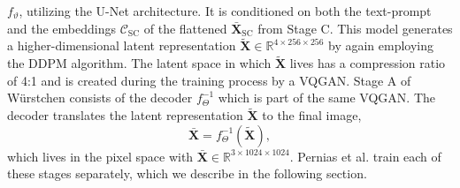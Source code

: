 $f_\vartheta$, utilizing the U-Net architecture. It is conditioned on both the
text-prompt and the embeddings $\mathcal{C}_{\text{SC}}$ of the flattened
$\bar{\boldsymbol{X}}_{\text{SC}}$ from Stage C. This model generates a
higher-dimensional latent representation
$\tilde{\boldsymbol{X}}\in\mathbb{R}^{4\times256\times256}$ by again employing
the DDPM algorithm. The latent space in which $\tilde{\boldsymbol{X}}$ lives
has a compression ratio of 4:1 and is created during the training process by a
VQGAN. Stage A of W\"urstchen consists of the decoder $f_\Theta^{-1}$ which is
part of the same VQGAN. The decoder translates the latent representation
$\tilde{\boldsymbol{X}}$ to the final image,
\begin{equation}
    \bar{\boldsymbol{X}} = f_\Theta^{-1}(\tilde{\boldsymbol{X}}),
\end{equation}
which lives in the pixel space with $\bar{\boldsymbol{X}}\in\mathbb{R}^{3\times1024\times1024}$.
Pernias et al. train each of these stages separately, which we describe in the
following section.
